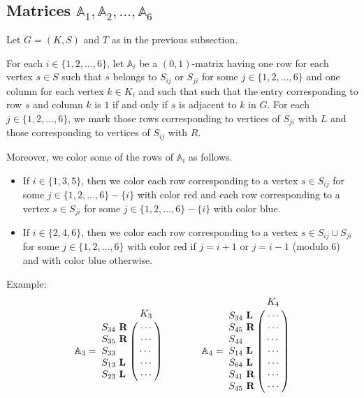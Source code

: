 \documentclass[a4paper,10pt]{report}
\theoremstyle{plain}
\theoremstyle{remark}
\theoremstyle{plain}
\begin{document}
{\subsection{Matrices $\mathbb A_1,\mathbb A_2,\ldots,\mathbb A_6$}

Let $G=(K,S)$ and $T$ as in the previous subsection.

For each $i\in\{1,2,\ldots,6\}$, let $\mathbb A_i$ be a $(0,1)$-matrix having one row for each vertex $s\in S$ such that $s$ belongs to $S_{ij}$ or $S_{ji}$ for some $j\in\{1,2,\ldots,6\}$ and one column for each vertex $k\in K_i$ and such that such that the entry corresponding to row $s$ and column $k$ is $1$ if and only if $s$ is adjacent to $k$ in $G$. For each $j\in\{1,2,\ldots,6\}$, we mark those rows corresponding to vertices of $S_{ji}$ with $L$ and those corresponding to vertices of $S_{ij}$ with $R$.

Moreover, we color some of the rows of $\mathbb A_i$ as follows.
\begin{itemize}
 \item If $i\in\{1,3,5\}$, then we color each row corresponding to a vertex $s\in S_{ij}$ for some $j\in\{1,2,\ldots,6\}-\{i\}$ with color red and each row corresponding to a vertex $s\in S_{ji}$ for some $j\in\{1,2,\ldots,6\}-\{i\}$ with color blue.
 \item If $i\in\{2,4,6\}$, then we color each row corresponding to a vertex $s\in S_{ij}\cup S_{ji}$ for some $j\in\{1,2,\ldots,6\}$ with color red if $j=i+1$ or $j=i-1$ (modulo $6$) and with color blue otherwise.
\end{itemize}

Example:
\[ \mathbb A_3 = \bordermatrix{ & K_3\cr
		S_{34}\ \textbf{R} & \textcolor{red}{\cdots} \cr
                S_{35}\ \textbf{R} & \textcolor{red}{\cdots} \cr
                S_{33}\            & \cdots \cr
                S_{13}\ \textbf{L} & \textcolor{blue}{\cdots} \cr
                S_{23}\ \textbf{L} & \textcolor{blue}{\cdots}}\qquad\qquad
   \mathbb A_4 = \bordermatrix{ & K_4\cr
		S_{34}\ \textbf{L} & \textcolor{red}{\cdots} \cr
                S_{45}\ \textbf{R} & \textcolor{red}{\cdots} \cr
                S_{44}\            & \cdots \cr
                S_{14}\ \textbf{L} & \textcolor{blue}{\cdots} \cr
                S_{64}\ \textbf{L} & \textcolor{blue}{\cdots} \cr
                S_{41}\ \textbf{R} & \textcolor{blue}{\cdots} \cr
                S_{45}\ \textbf{R} & \textcolor{blue}{\cdots}} \]


}
\end{document}
